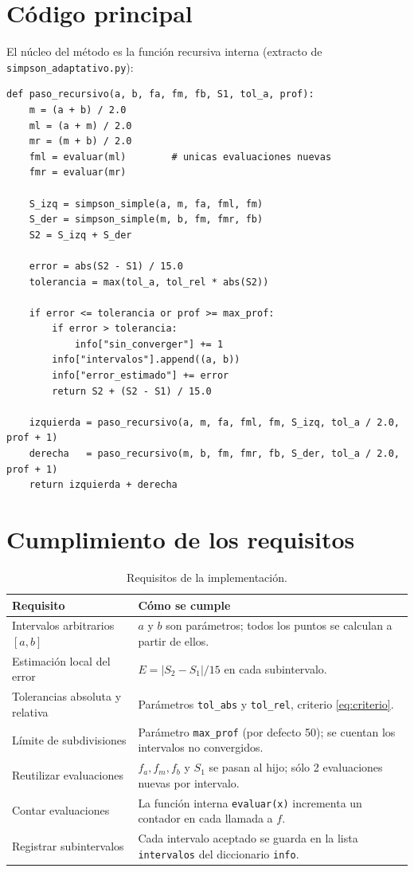 \documentclass[11pt,letterpaper]{report}
\begin{document}
\section{Código principal}
El núcleo del método es la función recursiva interna (extracto de
\texttt{simpson\_adaptativo.py}):
\begin{lstlisting}
def paso_recursivo(a, b, fa, fm, fb, S1, tol_a, prof):
    m = (a + b) / 2.0
    ml = (a + m) / 2.0
    mr = (m + b) / 2.0
    fml = evaluar(ml)        # unicas evaluaciones nuevas
    fmr = evaluar(mr)

    S_izq = simpson_simple(a, m, fa, fml, fm)
    S_der = simpson_simple(m, b, fm, fmr, fb)
    S2 = S_izq + S_der

    error = abs(S2 - S1) / 15.0
    tolerancia = max(tol_a, tol_rel * abs(S2))

    if error <= tolerancia or prof >= max_prof:
        if error > tolerancia:
            info["sin_converger"] += 1
        info["intervalos"].append((a, b))
        info["error_estimado"] += error
        return S2 + (S2 - S1) / 15.0

    izquierda = paso_recursivo(a, m, fa, fml, fm, S_izq, tol_a / 2.0, prof + 1)
    derecha   = paso_recursivo(m, b, fm, fmr, fb, S_der, tol_a / 2.0, prof + 1)
    return izquierda + derecha
\end{lstlisting}

\section{Cumplimiento de los requisitos}
\begin{table}[H]
\centering
\begin{tabular}{p{6cm}p{8.5cm}}
\toprule
\textbf{Requisito} & \textbf{Cómo se cumple} \\
\midrule
Intervalos arbitrarios $[a,b]$ & $a$ y $b$ son parámetros; todos los puntos se calculan a partir de ellos. \\
Estimación local del error & $E=|S_2-S_1|/15$ en cada subintervalo. \\
Tolerancias absoluta y relativa & Parámetros \texttt{tol\_abs} y \texttt{tol\_rel}, criterio \eqref{eq:criterio}. \\
Límite de subdivisiones & Parámetro \texttt{max\_prof} (por defecto 50); se cuentan los intervalos no convergidos. \\
Reutilizar evaluaciones & $f_a,f_m,f_b$ y $S_1$ se pasan al hijo; sólo 2 evaluaciones nuevas por intervalo. \\
Contar evaluaciones & La función interna \texttt{evaluar(x)} incrementa un contador en cada llamada a $f$. \\
Registrar subintervalos & Cada intervalo aceptado se guarda en la lista \texttt{intervalos} del diccionario \texttt{info}. \\
\bottomrule
\end{tabular}
\caption{Requisitos de la implementación.}
\end{table}
\end{document}
